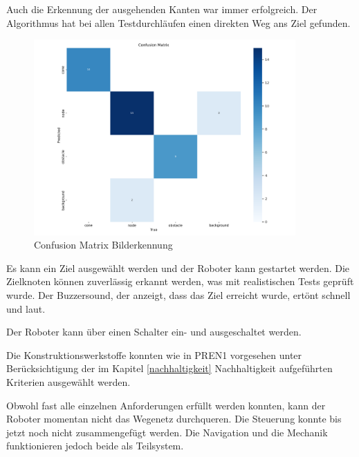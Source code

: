 Auch die Erkennung der ausgehenden Kanten war immer erfolgreich. Der Algorithmus hat bei allen Testdurchläufen einen direkten Weg ans Ziel gefunden. 

\begin{figure}[H]
\centering
\includegraphics[width=10cm]{assets/IT/yolo/confusion_matrix.png}
\caption{Confusion Matrix Bilderkennung}
\label{fig:conf-matrix-model}
\end{figure}

Es kann ein Ziel ausgewählt werden und der Roboter kann gestartet werden. Die Zielknoten können zuverlässig erkannt werden, was mit realistischen Tests geprüft wurde. Der Buzzersound, der anzeigt, dass das Ziel erreicht wurde, ertönt schnell und laut.

Der Roboter kann über einen Schalter ein- und ausgeschaltet werden.

Die Konstruktionswerkstoffe konnten wie in PREN1 vorgesehen unter Berücksichtigung der im Kapitel \ref{nachhaltigkeit} Nachhaltigkeit aufgeführten Kriterien ausgewählt werden.

Obwohl fast alle einzelnen Anforderungen erfüllt werden konnten, kann der Roboter momentan nicht das Wegenetz durchqueren. Die Steuerung konnte bis jetzt noch nicht zusammengefügt werden. Die Navigation und die Mechanik funktionieren jedoch beide als Teilsystem.